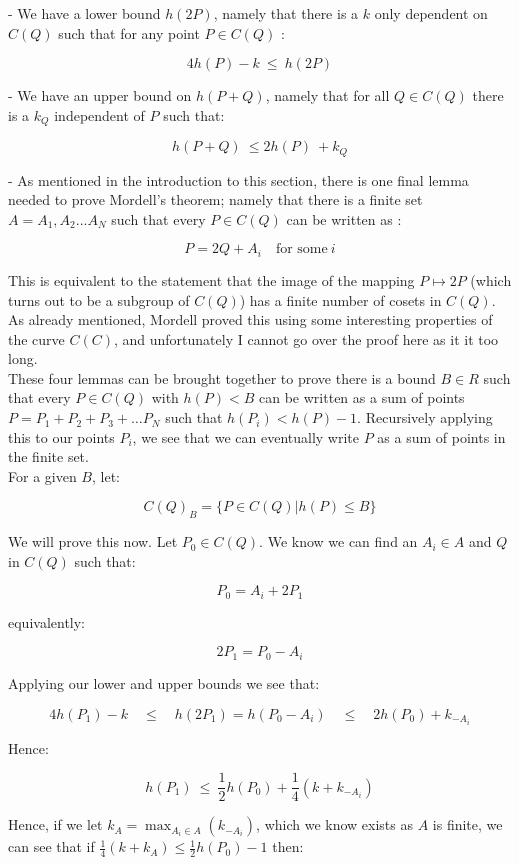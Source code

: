 \documentclass{article}
\begin{document}
- We have a lower bound $h(2P)$, namely that there is a $k$ only dependent on $C(Q)$ such that for any point $P \in C(Q)$ :

\[ 4h(P) - k \ \leq \ h(2P) \]

- We have an upper bound on $h(P + Q)$, namely that for all $Q \in C(Q)$ there is a $k_Q$ independent of $P$ such that:

\[ h(P + Q) \ \leq 2h(P) \ + k_Q \]

- As mentioned in the introduction to this section, there is one final lemma needed to prove Mordell's theorem; namely that there is a finite set $A = {A_1, A_2 ... A_N}$ such that every $P \in C(Q)$ can be written as :

\[ P = 2Q + A_i \quad \text{for some} \ i \]

This is equivalent to the statement that the image of the mapping $P \mapsto 2P$ (which turns out to be a subgroup of $C(Q)$) has a finite number of cosets in $C(Q)$. As already mentioned, Mordell proved this using some interesting properties of the curve $C(C)$, and unfortunately I cannot go over the proof here as it it too long.\\

These four lemmas can be brought together to prove there is a bound $B \in R$ such that every $P \in C(Q)$ with $h(P) < B$ can be written as a sum of points $P = P_1 + P_2 + P_3 + \dots P_N$ such that $h(P_i) < h(P) - 1$. Recursively applying this to our points $P_i$, we see that we can eventually write $P$ as a sum of points in the finite set.\\

For a given $B$, let:

\[ C(Q)_B = \{P \in C(Q) | h(P) \leq B\} \]

We will prove this now. Let $P_0 \in C(Q)$. We know we can find an $A_i \in A$ and $Q$ in $C(Q)$ such that:

\[P_0 = A_i + 2P_1 \]

equivalently:

\[ 2P_1 = P_0 - A_i \]

Applying our lower and upper bounds we see that:

\[ 4h(P_1) - k \quad \leq \quad  h(2P_1) =  h(P_0 - A_i)  \quad  \leq  \quad  2h(P_0) + k_{-A_i} \]

Hence:

\[ h(P_1) \ \leq \ \frac{1}{2}h(P_0) + \frac{1}{4} (k + k_{-A_i}) \]

Hence, if we let $k_A = \max_{A_i \in A}(k_{-A_i})$, which we know exists as $A$ is finite, we can see that if $\frac{1}{4}(k + k_A) \leq \frac{1}{2}h(P_0) - 1$ then:
\end{document}
